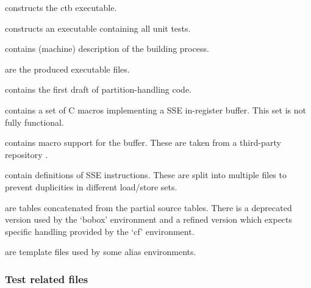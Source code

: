 \begin{description}
  \item {} constructs the ctb executable.
  \item {} constructs an executable containing all unit tests.
  \item {} contains (machine) description of the building process. 
  \item {} are the produced executable files.
  \item {} contains the first draft of partition-handling code.
  \item {} contains a set of C macros implementing a SSE in-register buffer. This set is not fully functional.
  \item {} contains macro support for the buffer. These are taken from a third-party repository \cite{cloak}.
  \item {} contain definitions of SSE instructions. These are split into multiple files to prevent duplicities in different load/store sets.
  \item {} are tables concatenated from the partial source tables. There is a deprecated version used by the `bobox' environment and a refined version which expects specific handling provided by the `cf' environment.
  \item {} are template files used by some alias environments.
\end{description}

\subsubsection{Test related files}

